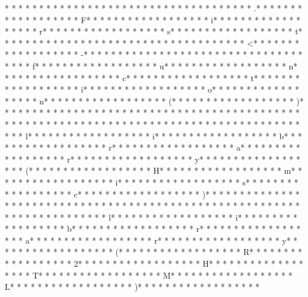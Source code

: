 * * *  * * *  * * *  *  * * *  *  * * *  * 
* * *  * * *  * * *  *  * * *  *  * * *  * .* * *  * * *  * * *  *  * * *  *  * * *  * F* * *  * * *  * * *  *  * * *  *  * * *  * i* * *  * * *  * * *  *  * * *  *  * * *  * r* * *  * * *  * * *  *  * * *  *  * * *  * s* * *  * * *  * * *  *  * * *  *  * * *  * t* * *  * * *  * * *  *  * * *  *  * * *  *  * * *  * * *  * * *  *  * * *  *  * * *  * <* * *  * * *  * * *  *  * * *  *  * * *  * -* * *  * * *  * * *  *  * * *  *  * * *  *  * * *  * * *  * * *  *  * * *  *  * * *  * f* * *  * * *  * * *  *  * * *  *  * * *  * u* * *  * * *  * * *  *  * * *  *  * * *  * n* * *  * * *  * * *  *  * * *  *  * * *  * c* * *  * * *  * * *  *  * * *  *  * * *  * t* * *  * * *  * * *  *  * * *  *  * * *  * i* * *  * * *  * * *  *  * * *  *  * * *  * o* * *  * * *  * * *  *  * * *  *  * * *  * n* * *  * * *  * * *  *  * * *  *  * * *  * (* * *  * * *  * * *  *  * * *  *  * * *  * )* * *  * * *  * * *  *  * * *  *  * * *  * {* * *  * * *  * * *  *  * * *  *  * * *  * 
* * *  * * *  * * *  *  * * *  *  * * *  *  * * *  * * *  * * *  *  * * *  *  * * *  *  * * *  * * *  * * *  *  * * *  *  * * *  * l* * *  * * *  * * *  *  * * *  *  * * *  * i* * *  * * *  * * *  *  * * *  *  * * *  * b* * *  * * *  * * *  *  * * *  *  * * *  * r* * *  * * *  * * *  *  * * *  *  * * *  * a* * *  * * *  * * *  *  * * *  *  * * *  * r* * *  * * *  * * *  *  * * *  *  * * *  * y* * *  * * *  * * *  *  * * *  *  * * *  * (* * *  * * *  * * *  *  * * *  *  * * *  * H* * *  * * *  * * *  *  * * *  *  * * *  * m* * *  * * *  * * *  *  * * *  *  * * *  * i* * *  * * *  * * *  *  * * *  *  * * *  * s* * *  * * *  * * *  *  * * *  *  * * *  * c* * *  * * *  * * *  *  * * *  *  * * *  * )* * *  * * *  * * *  *  * * *  *  * * *  * 
* * *  * * *  * * *  *  * * *  *  * * *  *  * * *  * * *  * * *  *  * * *  *  * * *  *  * * *  * * *  * * *  *  * * *  *  * * *  * l* * *  * * *  * * *  *  * * *  *  * * *  * i* * *  * * *  * * *  *  * * *  *  * * *  * b* * *  * * *  * * *  *  * * *  *  * * *  * r* * *  * * *  * * *  *  * * *  *  * * *  * a* * *  * * *  * * *  *  * * *  *  * * *  * r* * *  * * *  * * *  *  * * *  *  * * *  * y* * *  * * *  * * *  *  * * *  *  * * *  * (* * *  * * *  * * *  *  * * *  *  * * *  * R* * *  * * *  * * *  *  * * *  *  * * *  * 2* * *  * * *  * * *  *  * * *  *  * * *  * H* * *  * * *  * * *  *  * * *  *  * * *  * T* * *  * * *  * * *  *  * * *  *  * * *  * M* * *  * * *  * * *  *  * * *  *  * * *  * L* * *  * * *  * * *  *  * * *  *  * * *  * )* * *  * * *  * * *  *  * * *  *  * * *  * 
}
